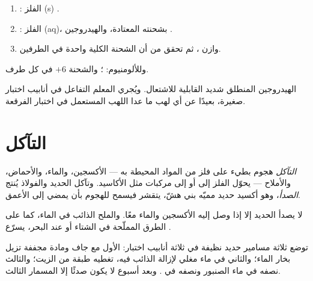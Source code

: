 \begin{method}\label{met:g9:metals-acids-corrosion:write}
\begin{enumerate}
  \item {}: الفلز (s)  .
  \item {}:  الفلز (aq)، بشحنته المعتادة،
        والهيدروجين .
  \item وازن ، ثم تحقق من أن الشحنة الكلية واحدة
        في الطرفين.
\end{enumerate}
وللألومنيوم: ؛ والشحنة
$+6$ في كل طرف.
\end{method}

\begin{safety}{}
الهيدروجين المنطلق شديد القابلية للاشتعال. ويُجري المعلم التفاعل في أنابيب
اختبار صغيرة، بعيدًا عن أي لهب ما عدا اللهب المستعمل في اختبار
الفرقعة.
\end{safety}

\section{التآكل}

\begin{definition}\label{def:g9:metals-acids-corrosion:corrosion}
\emph{التآكل} هجوم بطيء على فلز من المواد المحيطة به ---
الأكسجين، والماء، والأحماض، والأملاح --- يحوّل الفلز إلى  أو إلى مركبات
مثل الأكاسيد. وتآكل الحديد والفولاذ يُنتج \emph{الصدأ}، وهو أكسيد
حديد مميّه بني هشّ، يتقشر فيسمح للهجوم بأن يمضي إلى
الأعمق.
\end{definition}

\begin{proposition}\label{prop:g9:metals-acids-corrosion:needs}
لا يصدأ الحديد إلا إذا وصل إليه الأكسجين والماء معًا. والملح الذائب في
الماء، كما على الطرق المملّحة في الشتاء أو عند البحر، يسرّع
.
\end{proposition}

\begin{inthelab}
توضع ثلاثة مسامير حديد نظيفة في ثلاثة أنابيب اختبار: الأول مع  جاف ومادة
مجففة تزيل بخار الماء؛ والثاني في ماء مغلي لإزالة  الذائب فيه، تغطيه
طبقة من الزيت؛ والثالث نصفه في ماء الصنبور ونصفه في . وبعد أسبوع
لا يكون صدئًا إلا المسمار الثالث.
\end{inthelab}

